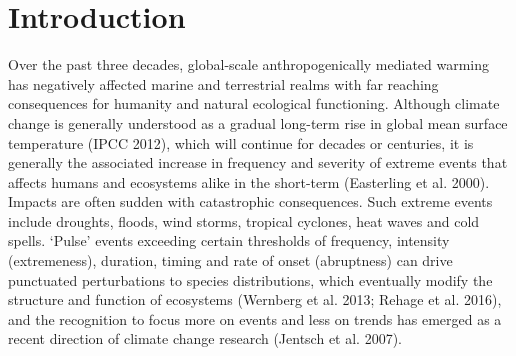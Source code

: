 \documentclass[a4paper,10pt,review]{elsarticle}
\begin{document}
\linenumbers

\section{Introduction}

Over the past three decades, global-scale anthropogenically mediated warming has negatively affected marine and terrestrial realms with far reaching consequences for humanity and natural ecological functioning.  Although climate change is generally understood as a gradual long-term rise in global mean surface temperature (IPCC 2012), which will continue for decades or centuries, it is generally the associated increase in frequency and severity of extreme events that affects humans and ecosystems alike in the short-term (Easterling et al. 2000). Impacts are often sudden with catastrophic consequences. Such extreme events include droughts, floods, wind storms, tropical cyclones, heat waves and cold spells. `Pulse' events exceeding certain thresholds of frequency, intensity (extremeness), duration, timing and rate of onset (abruptness) can drive punctuated perturbations to species distributions, which eventually modify the structure and function of ecosystems (Wernberg et al. 2013; Rehage et al. 2016), and the recognition to focus more on events and less on trends has emerged as a recent direction of climate change research (Jentsch et al. 2007). 
\end{document}
